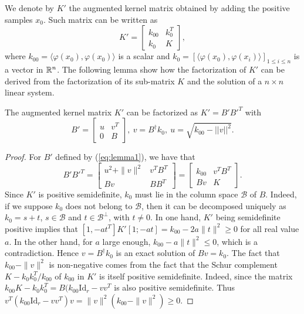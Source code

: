 We denote by $K'$ the augmented kernel matrix obtained by adding the positive samples $x_0$. Such matrix can be written as
\begin{equation}
K' = \begin{bmatrix}
k_{00} & k_0^T\\
k_0 & K
\end{bmatrix},
\end{equation}
where $k_{00}=\langle \varphi(x_0),\varphi(x_0)\rangle$ is a scalar and $k_0= [\langle \varphi(x_0),\varphi(x_i)\rangle]_{1\le i\le n}$ is a vector in $\mathbb R^n$. 
The following lemma show how the factorization of $K'$ can be derived from the factorization of its sub-matrix $K$ and the solution of a $n\times n$ linear system.

\begin{lemma} The augmented kernel matrix $K'$ can be factorized as $K'= B'B'^T$ with
\begin{equation}
B'=\begin{bmatrix}
u & v^T\\0 & B
\end{bmatrix},~
v = B^\dagger k_0,~ u=\sqrt{k_{00}-||v||^2}.
\label{eq:lemma1}
\end{equation}
\end{lemma}\label{lemma1}
\begin{proof}
For $B'$ defined by (\ref{eq:lemma1}), we have that
\begin{equation}
B'B'^T = 
\begin{bmatrix} u^2+\|v\|^2 & v^TB^T\\ 
Bv& BB^T\end{bmatrix} 
=\begin{bmatrix} k_{00} & v^TB^T\\ 
Bv& K\end{bmatrix} .
\end{equation}
Since $K'$ is positive semidefinite, $k_0$ must lie in the column space $\mathcal{B}$ of $B$.
Indeed, if we suppose $k_0$ does not belong to $\mathcal{B}$, then it can be decomposed uniquely as $k_0=s+t$, $s\in\mathcal{B}$ and  $t\in\mathcal{B}^\perp$, with $t\ne 0$. In one hand, $K'$ being semidefinite positive implies that $[1, -at^T]K'[1; -at]=k_{00}-2a\|t\|^2\ge 0$ for all real value $a$. In the other hand, for $a$ large enough, $k_{00}-a\|t\|^2\le 0$, which is a contradiction.
Hence $v=B^\dagger k_0$ is an exact solution of $Bv=k_0$. The fact that $k_{00}-\|v\|^2$ is non-negative comes from the fact that the Schur complement $K-k_0 k_0^T / k_{00}$ of $k_{00}$ in $K'$ is itself positive semidefinite.
Indeed, since the matrix $k_{00}K-k_0k_0^T=B(k_{00}\mathrm{Id}_r-vv^T$ is also positive semidefinite. Thus $v^T(k_{00}\mathrm{Id}_r-vv^T)v = \|v\|^2(k_{00}-\|v\|^2)\ge 0$. \qedhere
\end{proof}



